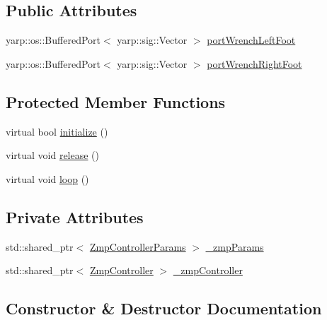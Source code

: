 \subsection*{Public Attributes}
\begin{DoxyCompactItemize}
\item 
yarp\+::os\+::\+Buffered\+Port$<$ yarp\+::sig\+::\+Vector $>$ \hyperlink{classWalkingClient_a88ee63ff6a341eccd458d24700383457}{port\+Wrench\+Left\+Foot}
\item 
yarp\+::os\+::\+Buffered\+Port$<$ yarp\+::sig\+::\+Vector $>$ \hyperlink{classWalkingClient_a96321dc60e84c193f2dea6e85983ca67}{port\+Wrench\+Right\+Foot}
\end{DoxyCompactItemize}
\subsection*{Protected Member Functions}
\begin{DoxyCompactItemize}
\item 
virtual bool \hyperlink{classWalkingClient_aba6a03fe29a4e947bc6bc0c09a713b2a}{initialize} ()
\item 
virtual void \hyperlink{classWalkingClient_a3b36da9d7649865a13c9318dd73ebc7e}{release} ()
\item 
virtual void \hyperlink{classWalkingClient_afd997bb00534c57fe1b0d5f37f207386}{loop} ()
\end{DoxyCompactItemize}
\subsection*{Private Attributes}
\begin{DoxyCompactItemize}
\item 
std\+::shared\+\_\+ptr$<$ \hyperlink{structZmpControllerParams}{Zmp\+Controller\+Params} $>$ \hyperlink{classWalkingClient_a20012b4bee7f6de8177ed53907f894cb}{\+\_\+zmp\+Params}
\item 
std\+::shared\+\_\+ptr$<$ \hyperlink{classZmpController}{Zmp\+Controller} $>$ \hyperlink{classWalkingClient_afc6a0ac97a4c3f83e27879e803fab8f6}{\+\_\+zmp\+Controller}
\end{DoxyCompactItemize}


\subsection{Constructor \& Destructor Documentation}
\hypertarget{classWalkingClient_a6c9002a44a54814c4b482739824e39aa}{}\label{classWalkingClient_a6c9002a44a54814c4b482739824e39aa} 
